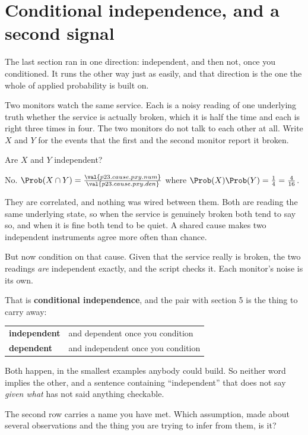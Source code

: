 \section{Conditional independence, and a second signal}
\label{sec:P23-conditional}

\begin{fr}
The last section ran in one direction: independent, and then not, once you
conditioned. It runs the other way just as easily, and that direction is the
one the whole of applied probability is built on.

Two monitors watch the same service. Each is a noisy reading of one underlying
truth \dash{} whether the service is actually broken, which it is half the
time \dash{} and each is right three times in four. The two monitors do not
talk to each other at all. Write $X$ and $Y$ for the events that the first and
the second monitor report it broken.

Are $X$ and $Y$ independent?
\dotline
\nextframe
\end{fr}

\begin{fr}
\begin{ansblock}
No. $\Prob(X \cap Y) = \frac{\val{p23.cause.pxy.num}}{\val{p23.cause.pxy.den}}$
where $\Prob(X)\Prob(Y) = \frac{1}{4} = \frac{4}{16}$.
\end{ansblock}

They are correlated, and nothing was wired between them. Both are reading the
same underlying state, so when the service is genuinely broken both tend to say
so, and when it is fine both tend to be quiet. A shared cause makes two
independent instruments agree more often than chance.

But now condition on that cause. Given that the service really is broken, the
two readings \emph{are} independent \dash{} exactly, and the script checks it.
Each monitor's noise is its own.
\end{fr}

\begin{fr}
That is \textbf{conditional independence}, and the pair with section 5 is the
thing to carry away:

\begin{center}
\begin{tabular}{ll}
\toprule
\textbf{independent} & and dependent once you condition \\
\textbf{dependent}   & and independent once you condition \\
\bottomrule
\end{tabular}
\end{center}

Both happen, in the smallest examples anybody could build. So neither word
implies the other, and a sentence containing \enquote{independent} that does
not say \emph{given what} has not said anything checkable.

The second row carries a name you have met. Which assumption, made about
several observations and the thing you are trying to infer from them, is it?
\dotline
\nextframe
\end{fr}

